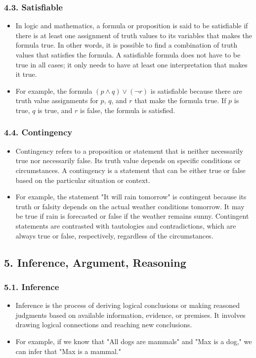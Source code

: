\documentclass{article}
\begin{document}
\subsubsection*{4.3. Satisfiable}
\begin{itemize}
\item In logic and mathematics, a formula or proposition is said to be satisfiable if there is at least one assignment of truth values to its variables that makes the formula true. In other words, it is possible to find a combination of truth values that satisfies the formula. A satisfiable formula does not have to be true in all cases; it only needs to have at least one interpretation that makes it true.
\item For example, the formula $(p \land q) \lor (\neg r)$ is satisfiable because there are truth value assignments for $p$, $q$, and $r$ that make the formula true. If $p$ is true, $q$ is true, and $r$ is false, the formula is satisfied.
\end{itemize}
\subsubsection*{4.4. Contingency}
\begin{itemize}
\item Contingency refers to a proposition or statement that is neither necessarily true nor necessarily false. Its truth value depends on specific conditions or circumstances. A contingency is a statement that can be either true or false based on the particular situation or context.
\item For example, the statement "It will rain tomorrow" is contingent because its truth or falsity depends on the actual weather conditions tomorrow. It may be true if rain is forecasted or false if the weather remains sunny. Contingent statements are contrasted with tautologies and contradictions, which are always true or false, respectively, regardless of the circumstances.
\end{itemize}
\subsection*{5. Inference, Argument, Reasoning}
\subsubsection*{5.1. Inference}
\begin{itemize}
\item Inference is the process of deriving logical conclusions or making reasoned judgments based on available information, evidence, or premises. It involves drawing logical connections and reaching new conclusions.
\item For example, if we know that "All dogs are mammals" and "Max is a dog," we can infer that "Max is a mammal."
\end{itemize}
\end{document}
